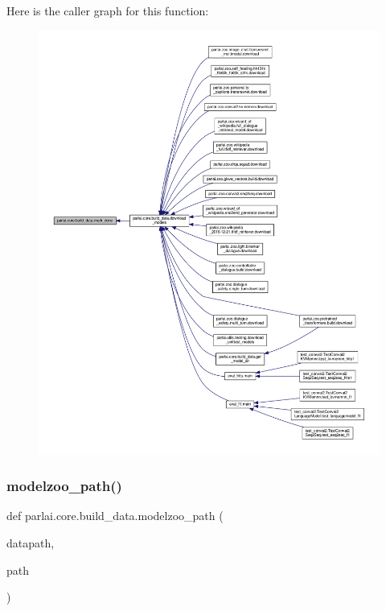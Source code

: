 Here is the caller graph for this function\+:
\nopagebreak
\begin{figure}[H]
\begin{center}
\leavevmode
\includegraphics[width=350pt]{namespaceparlai_1_1core_1_1build__data_a2527e6d29b0ccb7b841182890ac36a59_icgraph}
\end{center}
\end{figure}
\mbox{\label{namespaceparlai_1_1core_1_1build__data_ad06e9e38ca85db9c4a676ccd9ae41649}} 
\subsubsection{\texorpdfstring{modelzoo\+\_\+path()}{modelzoo\_path()}}
{\footnotesize\ttfamily def parlai.\+core.\+build\+\_\+data.\+modelzoo\+\_\+path (\begin{DoxyParamCaption}\item[{}]{datapath,  }\item[{}]{path }\end{DoxyParamCaption})}

